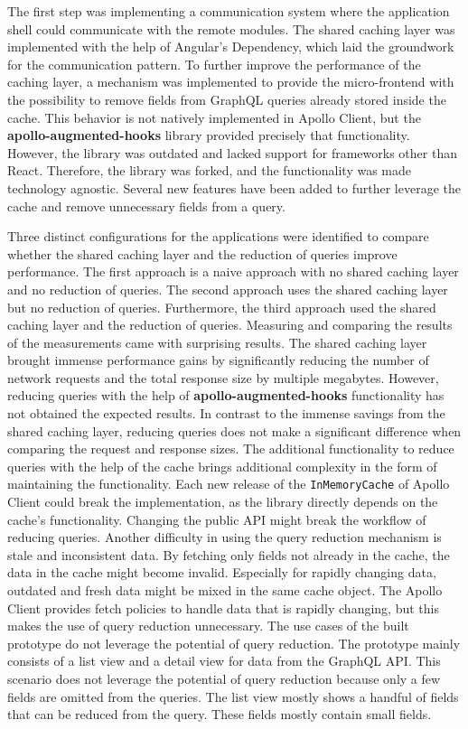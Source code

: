 \bigskip

\noindent The first step was implementing a communication system where the application shell could communicate with the remote modules. The shared caching layer was implemented with the help of Angular's Dependency, which laid the groundwork for the communication pattern. To further improve the performance of the caching layer, a mechanism was implemented to provide the micro-frontend with the possibility to remove fields from GraphQL queries already stored inside the cache. This behavior is not natively implemented in Apollo Client, but the \textbf{apollo-augmented-hooks} library provided precisely that functionality. However, the library was outdated and lacked support for frameworks other than React. Therefore, the library was forked, and the functionality was made technology agnostic. Several new features have been added to further leverage the cache and remove unnecessary fields from a query.

\bigskip

\noindent Three distinct configurations for the applications were identified to compare whether the shared caching layer and the reduction of queries improve performance. The first approach is a naive approach with no shared caching layer and no reduction of queries. The second approach uses the shared caching layer but no reduction of queries. Furthermore, the third approach used the shared caching layer and the reduction of queries. Measuring and comparing the results of the measurements came with surprising results. The shared caching layer brought immense performance gains by significantly reducing the number of network requests and the total response size by multiple megabytes. However, reducing queries with the help of \textbf{apollo-augmented-hooks} functionality has not obtained the expected results. In contrast to the immense savings from the shared caching layer, reducing queries does not make a significant difference when comparing the request and response sizes. The additional functionality to reduce queries with the help of the cache brings additional complexity in the form of maintaining the functionality. Each new release of the \texttt{InMemoryCache} of Apollo Client could break the implementation, as the library directly depends on the cache's functionality. Changing the public \ac{API} might break the workflow of reducing queries. Another difficulty in using the query reduction mechanism is stale and inconsistent data. By fetching only fields not already in the cache, the data in the cache might become invalid. Especially for rapidly changing data, outdated and fresh data might be mixed in the same cache object. The Apollo Client provides fetch policies to handle data that is rapidly changing, but this makes the use of query reduction unnecessary. 
The use cases of the built prototype do not leverage the potential of query reduction. The prototype mainly consists of a list view and a detail view for data from the GraphQL \ac{API}. This scenario does not leverage the potential of query reduction because only a few fields are omitted from the queries. The list view mostly shows a handful of fields that can be reduced from the query. These fields mostly contain small fields.

